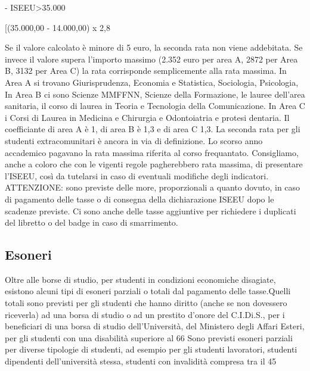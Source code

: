   \item- ISEEU>35.000 {[(35.000,00 - 14.000,00) x 2,8%

Se il valore calcolato è minore di 5 euro, la seconda rata non viene addebitata. Se invece il valore supera l'importo massimo (2.352 euro per area A, 2872 per Area B, 3132 per Area C) la rata corrisponde semplicemente alla rata massima. In Area A si trovano Giurisprudenza, Economia e Statistica, Sociologia, Psicologia, In Area B ci sono Scienze MMFFNN, Scienze della Formazione, le lauree dell'area sanitaria, il corso di laurea in Teoria e Tecnologia della Comunicazione. In Area C i Corsi di Laurea in Medicina e Chirurgia e Odontoiatria e protesi dentaria.
Il coefficiante di area A è 1, di area B è 1,3 e di area C 1,3.
La seconda rata per gli studenti extracomunitari è ancora in via di definizione. Lo scorso anno accademico pagavano la rata massima riferita al corso frequantato. Consigliamo, anche a coloro che con le vigenti regole pagherebbero rata massima, di presentare l'ISEEU, così da tutelarsi in caso di eventuali modifiche degli indicatori.
ATTENZIONE: sono previste delle more, proporzionali a quanto dovuto, in caso di pagamento delle tasse o di consegna della dichiarazione ISEEU dopo le scadenze previste. Ci sono anche delle tasse aggiuntive per richiedere i duplicati del libretto o del badge in caso di smarrimento.
 
\subsection{Esoneri}
Oltre alle borse di studio, per studenti in condizioni economiche disagiate, esistono alcuni tipi di esoneri parziali o totali dal pagamento delle tasse.Quelli totali sono previsti per gli studenti che hanno diritto (anche se non dovessero riceverla) ad una borsa di studio o ad un prestito d'onore del C.I.Di.S., per i beneficiari di una borsa di studio dell'Università, del Ministero degli Affari Esteri, per gli studenti con una disabilità superiore al 66%
Sono previsti esoneri parziali per diverse tipologie di studenti, ad esempio per gli studenti lavoratori, studenti dipendenti dell'università stessa, studenti con invalidità compresa tra il 45%

}
